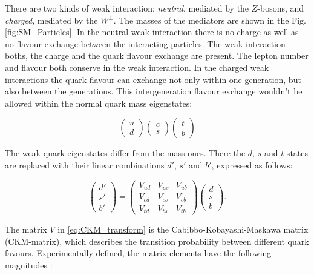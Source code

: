 There are two kinds of weak interaction: \textit{neutral}, mediated by the $Z$-bosons, and \textit{charged}, mediated by the $W^{\pm}$. The masses of the 
mediators are shown in the Fig. \ref{fig:SM_Particles}.	In the neutral weak interaction there is no charge as well as no flavour exchange between the 
interacting particles. The weak interaction boths, the charge and the quark flavour exchange are present. The lepton number and flavour both conserve
in the weak interaction. In the charged weak interactions the quark flavour can exchange not only within one generation, but also between the generations.
This intergeneration flavour exchange wouldn't be allowed within the normal quark mass eigenstates:

\begin{equation}
\left( \begin{array}{c}
       u \\ d
      \end{array} \right)
\left( \begin{array}{c}
       c \\ s
      \end{array} \right)
\left( \begin{array}{c}
       t \\ b
      \end{array} \right)
\end{equation}
  
The weak quark eigenstates differ from the mass ones. There the $d$, $s$ and $t$ states are replaced with their linear combinations $d'$, $s'$ and $b'$,
expressed as follows:

\begin{equation} \label{eq:CKM_transform}
\left( \begin{array}{c} d' \\ s' \\ b' \end{array} \right) = 
\left( \begin{array}{ccc} V_{ud} & V_{us} & V_{ub} \\ V_{cd} & V_{cs} & V_{cb} \\ V_{td} & V_{ts} & V_{tb} \end{array} \right)
\left( \begin{array}{c} d \\ s \\ b\end{array} \right).
\end{equation}

The matrix $V$ in \ref{eq:CKM_transform} is the Cabibbo-Kobayashi-Maskawa matrix \cite{Kobayashi:1973fv} (CKM-matrix), which describes the transition probability 
between different quark favours. Experimentally defined, the matrix elements have the following magnitudes \cite{PDG-2012}:

